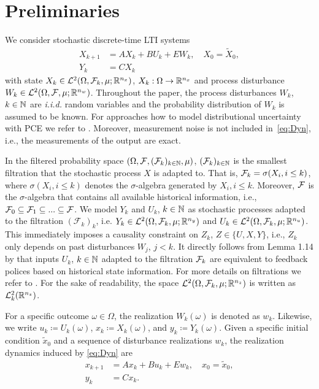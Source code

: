 \section{Preliminaries} \label{sec:Preliminaries}
We consider stochastic discrete-time LTI systems
\begin{subequations} \label{eq:Dyn}
	\begin{align}
		X_{k+1} &= AX_k + BU_k + EW_k,\quad X_0=\tilde{X}_0,\\
		Y_k &= CX_k\label{eq:Output}
	\end{align}
\end{subequations}
with state $X_k \in\mathcal{L}^2(\Omega, \mathcal{F}_{k}, \mu; \mathbb{R}^{n_x})$, $X_k:\Omega\to\mathbb{R}^{n_x}$ and process disturbance $W_k \in \mathcal{L}^2(\Omega, \mathcal{F}, \mu; \mathbb{R}^{n_w})$. Throughout the paper, the process disturbances $W_k$, $k\in\mathbb{N}$ are \textit{i.i.d.} random variables and the probability distribution of $W_k$ is assumed to be known. For approaches how to model distributional uncertainty with PCE we refer to \citet{pan23distributionally}. Moreover, measurement noise is not included in~\eqref{eq:Dyn}, i.e., the measurements of the output are exact.

In the filtered probability space $(\Omega, \mathcal{F}, (\mathcal{F}_k)_{k\in \mathbb{N}}, \mu)$, $(\mathcal{F}_k)_{k\in \mathbb{N}}$ is the smallest filtration that the stochastic process $X$ is adapted to. That is, $\mathcal{F}_k = \sigma(X_i,i\leq k)$, where $\sigma(X_i,i\leq k)$ denotes the $\sigma$-algebra generated by $X_i,i\leq k$. Moreover, $\mathcal{F}$ is the $\sigma$-algebra that contains all available historical information, i.e., $\mathcal{F}_0 \subseteq \mathcal{F}_1 \subseteq ...  \subseteq \mathcal{F}$. We model $Y_k$ and $U_k$, $k\in\mathbb{N}$ as stochastic processes adapted to the filtration $(\mathcal{F}_k)_k$, i.e. $Y_k \in\mathcal{L}^2(\Omega, \mathcal{F}_{k}, \mu; \mathbb{R}^{{n_y}})$ and $U_k \in\mathcal{L}^2(\Omega, \mathcal{F}_{k}, \mu; \mathbb{R}^{{n_u}})$. This immediately imposes a causality constraint on $Z_k$, $Z\in\{U,X,Y\}$, i.e., $Z_k$ only depends on past disturbances $W_j$, $j< k$. It directly follows from Lemma 1.14 by \citet{kallenberg97foundations} that inputs $U_k$, $k\in\mathbb{N}$ adapted to the filtration $\mathcal{F}_k$ are equivalent to feedback polices based on historical state information. For more details on filtrations we refer to \citet{fristedt13modern}. For the sake of readability, the space $\mathcal{L}^2(\Omega, \mathcal{F}_{k}, \mu; \mathbb{R}^{n_z})$ is written as $\mathcal{L}^2_{k}(\mathbb{R}^{n_z})$.

For a specific outcome $\omega \in \Omega$, the realization $W_k(\omega)$ is denoted as $w_k$. Likewise, we write $u_k \coloneqq U_k(\omega)$, $x_k \coloneqq X_k(\omega)$, and $y_k \coloneqq Y_k(\omega)$. Given a specific initial condition $\tilde{x}_0$ and a sequence of disturbance realizations $w_k$, the realization dynamics induced by \eqref{eq:Dyn} are
\begin{subequations} \label{eq:DynReal}
	\begin{align} 
		x_{k+1} &= Ax_k + Bu_k +  Ew_k,\quad x_0=\tilde{x}_0,\\
		y_k &= Cx_k.
	\end{align}
\end{subequations}

